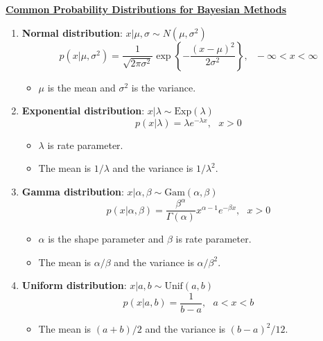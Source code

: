 \documentclass[11pt]{article}
\newcommand{\ub}[1]{{\bf \uline{#1}}}
\begin{document}
\vspace{-.2in}

\ub{Common Probability Distributions for Bayesian Methods}
\begin{enumerate}
\item {\bf Normal distribution}: $x|\mu,\sigma\sim N(\mu,\sigma^2)$\vspace{-.05in}
$$
p(x|\mu,\sigma^2) = \dfrac{1}{\sqrt{2\pi\sigma^2}}\exp\left\{ -\dfrac{(x-\mu)^2}{2\sigma^2}\right\}, \ \ \ -\infty<x<\infty
$$
\begin{itemize}
\item $\mu$ is the mean and $\sigma^2$ is the variance.\\
\end{itemize}
\vspace{-.1in}

\item {\bf Exponential distribution}: $x|\lambda\sim \text{Exp}(\lambda)$ \vspace{-.05in}
$$
p(x|\lambda) = \lambda e^{-\lambda x}, \ \ \ x>0
$$
\vspace{-.4in}
\begin{itemize}
\item $\lambda$ is rate parameter.
\item The mean is $1/\lambda$ and the variance is $1/\lambda^2$.\\
\end{itemize}
\vspace{-.1in}

\item {\bf Gamma distribution}: $x|\alpha,\beta\sim \text{Gam}(\alpha,\beta)$\vspace{-.05in}
$$
p(x|\alpha,\beta)=\dfrac{\beta^\alpha}{\Gamma(\alpha)}x^{\alpha-1}e^{-\beta x}, \ \ \ x>0
$$
\vspace{-.2in}
\begin{itemize}
\item $\alpha$ is the shape parameter and $\beta$ is rate parameter.
\item The mean is $\alpha/\beta$ and the variance is $\alpha/\beta^2$.\\
\end{itemize}
\vspace{-.1in}

\item {\bf Uniform distribution}: $x|a,b\sim \text{Unif}(a,b)$\vspace{-.05in}
$$
p(x|a,b) = \dfrac{1}{b-a},\ \ \ a<x<b
$$
\vspace{-.2in}
\begin{itemize}
\item The mean is $(a+b)/2$ and the variance is $(b-a)^2/12$.\\
\end{itemize}
\end{enumerate}
\end{document}

